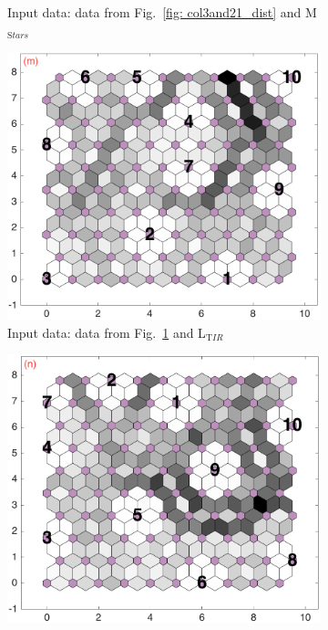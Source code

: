 \begin{figure}
\begin{subfigure}[b]{0.25\textwidth}
        \caption{Input data: data from Fig.~\ref{fig: col3and21_dist} and M$_{{\mathrm Stars}}$}
        \label{fig: col3and22_dist}
    \end{subfigure}
            \hfill
    \begin{subfigure}[b]{0.25\textwidth}
        \centering
        \includegraphics[width=\textwidth]{../../images0.01/M31/2D/diff_dimension/combine_2D_data_between_cols3and23.png}
        \caption{Input data: data from Fig.~\ref{fig: col3and22_dist} and L$_{{\mathrm TIR}}$}
        \label{fig: col3and23_dist}
    \end{subfigure}
            \hfill
    \begin{subfigure}[b]{0.25\textwidth}
        \centering
        \includegraphics[width=\textwidth]{../../images0.01/M31/2D/diff_dimension/combine_2D_data_between_cols3and24.png}

\end{subfigure}
\end{figure}
